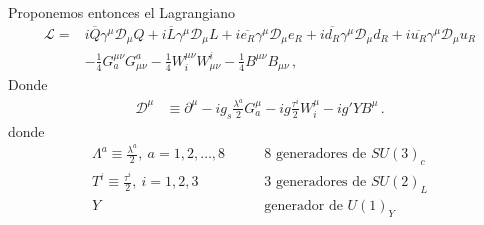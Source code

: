 \begin{frame}
Proponemos entonces el Lagrangiano
\begin{align}
     \mathcal{L}=&i\overline{Q}\gamma^\mu\mathcal{D}_\mu Q+i\overline{L}\gamma^\mu\mathcal{D}_\mu L+
i\overline{e_R}\gamma^\mu\mathcal{D}_\mu {e_R}+i\overline{d_R}\gamma^\mu\mathcal{D}_\mu {d_R}+i\overline{u_R}\gamma^\mu\mathcal{D}_\mu {u_R}
\nonumber\\
     &-\tfrac{1}{4}G^{\mu\nu}_a G_{\mu\nu}^a-\tfrac{1}{4}W^{\mu\nu}_i W_{\mu\nu}^i-\tfrac{1}{4}B^{\mu\nu} B_{\mu\nu}\,,
\end{align}
Donde
\begin{align}
  \mathcal{D}^\mu&\equiv\partial^\mu-i g_s\frac{\lambda^a}{2}G^\mu_a-i g \frac{\tau^i}{2}W^\mu_i-i g'YB^\mu\,.
\end{align}
donde
\begin{align*}
  \Lambda^a\equiv\frac{\lambda^a}{2},\ a=1,2,\ldots,8 &\qquad\text{8 generadores de $SU(3)_c$}\\
  T^i\equiv\frac{\tau^i}{2},\ i=1,2,3 &\qquad\text{3 generadores de $SU(2)_L$}\\
  Y &\qquad\text{generador de $U(1)_Y$}
\end{align*}


\end{frame}
